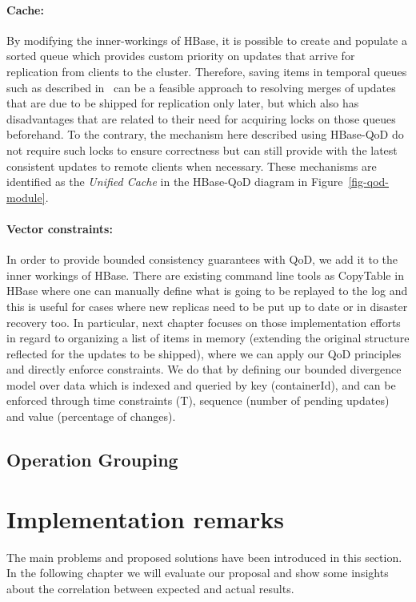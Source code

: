 \paragraph*{Cache:}
By modifying the inner-workings of HBase, it is possible to create and populate a sorted queue which provides custom priority on updates that arrive for replication from clients to the cluster. Therefore, saving items in temporal queues such as described in~\cite{Kraska:2009} can be a feasible approach to resolving merges of updates that are due to be shipped for replication only later, but which also has disadvantages that are related to their need for acquiring locks on those queues beforehand. To the contrary, the mechanism here described using HBase-QoD do not require such locks to ensure correctness but can still provide with the latest consistent updates to remote clients when necessary. These mechanisms are identified as the \emph{Unified Cache} in the HBase-QoD diagram in Figure~\ref{fig-qod-module}.

\paragraph*{Vector constraints:}
In order to provide bounded consistency guarantees with QoD, we add it to the inner workings of HBase. There are existing command line tools as CopyTable in HBase where one can manually define what is going to be replayed to the log and this is useful for cases where new replicas need to be put up to date or in disaster recovery too. In particular, next chapter focuses on those implementation efforts in regard to organizing a list of items in memory (extending the original structure reflected for the updates to be shipped), where we can apply our QoD principles and directly enforce constraints. We do that by defining our bounded divergence model over data which is indexed and queried by key (containerId), and can be enforced through time constraints (T), sequence (number of pending updates) and value (percentage of changes).


\subsection{Operation Grouping}\label{grouping}
 


\section{Implementation remarks}\label{summary-implementation}
The main problems and proposed solutions have been introduced in this section. In the following chapter we will evaluate our proposal and show some insights about the correlation between expected and actual results.

